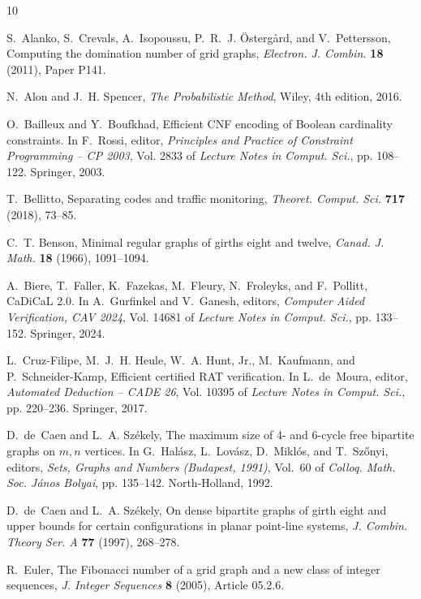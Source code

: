 \documentclass[12pt]{article}
\theoremstyle{plain}
\theoremstyle{definition}
\theoremstyle{remark}
\begin{document}
\begin{thebibliography}{10}

S.~Alanko, S.~Crevals, A.~Isopoussu, P.~R.~J. {\"O}sterg{\aa}rd, and
  V.~Pettersson, Computing the domination number of grid graphs, {\em Electron.
  J. Combin.} {\bf 18} (2011), Paper P141.

N.~Alon and J.~H. Spencer, {\em The Probabilistic Method}, Wiley, 4th edition,
  2016.

O.~Bailleux and Y.~Boufkhad, Efficient {CNF} encoding of {B}oolean cardinality
  constraints.
\newblock In F.~Rossi, editor, {\em Principles and Practice of Constraint
  Programming -- {CP} 2003}, Vol. 2833 of {\em Lecture Notes in Comput. Sci.},
  pp.  108--122. Springer, 2003.

T.~Bellitto, Separating codes and traffic monitoring, {\em Theoret. Comput.
  Sci.} {\bf 717} (2018), 73--85.

C.~T. Benson, Minimal regular graphs of girths eight and twelve, {\em Canad. J.
  Math.} {\bf 18} (1966), 1091--1094.

A.~Biere, T.~Faller, K.~Fazekas, M.~Fleury, N.~Froleyks, and F.~Pollitt,
  {CaDiCaL} 2.0.
\newblock In A.~Gurfinkel and V.~Ganesh, editors, {\em Computer Aided
  Verification, {CAV} 2024}, Vol. 14681 of {\em Lecture Notes in Comput. Sci.},
  pp.  133--152. Springer, 2024.

L.~Cruz-Filipe, M.~J.~H. Heule, W.~A. Hunt, Jr., M.~Kaufmann, and
  P.~Schneider-Kamp, Efficient certified {RAT} verification.
\newblock In L.~de~Moura, editor, {\em Automated Deduction -- {CADE} 26}, Vol.
  10395 of {\em Lecture Notes in Comput. Sci.}, pp.  220--236. Springer, 2017.

D.~de~Caen and L.~A. Sz{\'e}kely, The maximum size of 4- and 6-cycle free
  bipartite graphs on $m,n$ vertices.
\newblock In G.~Hal{\'a}sz, L.~Lov{\'a}sz, D.~Mikl{\'o}s, and T.~Sz{\H{o}}nyi,
  editors, {\em Sets, Graphs and Numbers (Budapest, 1991)}, Vol.~60 of {\em
  Colloq. Math. Soc. J{\'a}nos Bolyai}, pp.  135--142. North-Holland, 1992.

D.~de~Caen and L.~A. Sz{\'e}kely, On dense bipartite graphs of girth eight and
  upper bounds for certain configurations in planar point-line systems, {\em J.
  Combin. Theory Ser. A} {\bf 77} (1997), 268--278.

R.~Euler, The {F}ibonacci number of a grid graph and a new class of integer
  sequences, {\em J. Integer Sequences} {\bf 8} (2005), Article 05.2.6.


\end{thebibliography}
\end{document}
